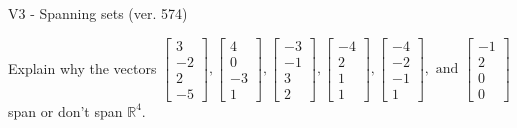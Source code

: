 \begin{exercise}
  \begin{exerciseTitle}V3 - Spanning sets (ver. 574)\end{exerciseTitle}
  \begin{exerciseStatement}
    Explain why the vectors \(\left[\begin{array}{r}
3 \\
-2 \\
2 \\
-5
\end{array}\right] , \left[\begin{array}{r}
4 \\
0 \\
-3 \\
1
\end{array}\right] , \left[\begin{array}{r}
-3 \\
-1 \\
3 \\
2
\end{array}\right] , \left[\begin{array}{r}
-4 \\
2 \\
1 \\
1
\end{array}\right] , \left[\begin{array}{r}
-4 \\
-2 \\
-1 \\
1
\end{array}\right] , \text{ and } \left[\begin{array}{r}
-1 \\
2 \\
0 \\
0
\end{array}\right]\) span or don't span \(\mathbb{R}^4\). 
	



\end{exerciseStatement}
\end{exercise}
